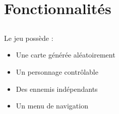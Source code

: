 \documentclass{beamer}
\begin{document}
\section{Fonctionnalités}
\subsection{}
\begin{frame}
Le jeu possède :
\begin{itemize}
	\item Une carte générée aléatoirement
	\item Un personnage contrôlable
	\item Des ennemis indépendants
	\item Un menu de navigation
\end{itemize}
\end{frame}
\end{document}
